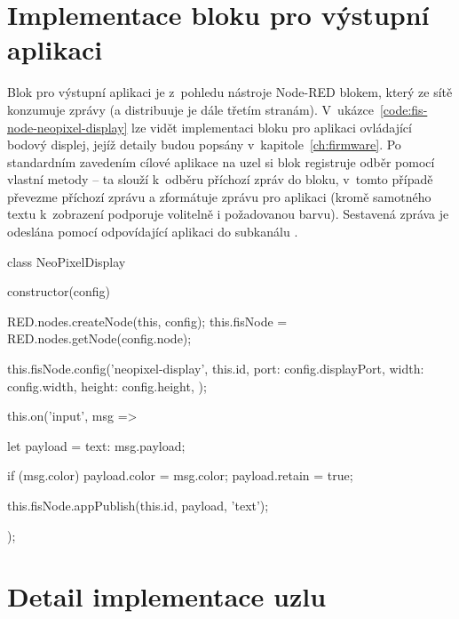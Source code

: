 \section{Implementace bloku pro výstupní aplikaci}\label{sec:implementace-bloku-pro-vystupni-aplikace}
Blok pro výstupní aplikaci je z~pohledu nástroje Node-RED blokem, který ze sítě konzumuje zprávy (a distribuuje je
dále třetím stranám).
V~ukázce~\ref{code:fis-node-neopixel-display} lze vidět implementaci bloku pro aplikaci ovládající bodový displej,
jejíž detaily budou popsány v~kapitole~\ref{ch:firmware}.
Po standardním zavedením cílové aplikace na uzel si blok registruje odběr pomocí vlastní metody  -- ta slouží
k~odběru příchozí zpráv do bloku, v~tomto případě převezme příchozí zprávu a zformátuje zprávu pro aplikaci
(kromě samotného textu k~zobrazení podporuje volitelně i požadovanou barvu).
Sestavená zpráva je odeslána pomocí  odpovídající aplikaci do subkanálu .

\begin{code}[
    language=Javascript,
    label=code:fis-node-neopixel-display,
    caption={Implementace bloku pro aplikaci ovládající bodový displej -- kromě samotné konfigurace na cílovém uzlu
    si uzel zaregistruje funkci pro odběr události typu \ic{\'input\'}.
    Událost tohoto typu notifikuje blok o~příchozí zprávě, která je v~tomto případě odeslána do aplikace k~zobrazení
    na displeji.}
]
class NeoPixelDisplay {
    constructor(config) {
        RED.nodes.createNode(this, config);
        this.fisNode = RED.nodes.getNode(config.node);

        this.fisNode.config('neopixel-display', this.id, {
            port: config.displayPort,
            width: config.width,
            height: config.height,
        });

        this.on('input', msg => {
            let payload = {text: msg.payload};

            if (msg.color)
                payload.color = msg.color;
            payload.retain = true;

            this.fisNode.appPublish(this.id, payload, 'text');
        });
    }
}
\end{code}

\section{Detail implementace uzlu}
